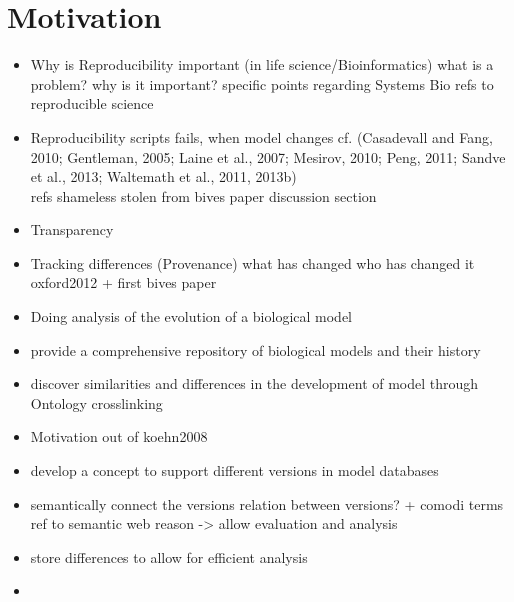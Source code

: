 \section{Motivation}

\begin{itemize}
\item Why is Reproducibility important (in life science/Bioinformatics)
	\subitem what is a problem?
	\subitem why is it important?
	\subitem specific points regarding Systems Bio
	\subitem refs to reproducible science
\item Reproducibility
	\subitem \sedml scripts fails, when model changes
	\subitem cf. (Casadevall and Fang, 2010; Gentleman, 2005; Laine et al., 2007; Mesirov, 2010; Peng, 2011; Sandve et al., 2013; Waltemath et al., 2011, 2013b) \\ refs shameless stolen from bives paper discussion section

\item Transparency
\item Tracking differences (Provenance)
	\subitem what has changed
	\subitem who has changed it
	\subitem oxford2012 + first bives paper
	
\item Doing analysis of the evolution of a biological model
\item provide a comprehensive repository of biological models and their history
\item discover similarities and differences in the development of model through Ontology crosslinking
\item Motivation out of koehn2008 \cite{Kohn2008}
\end{itemize}

\begin{itemize}
\item develop a concept to support different versions in model databases
	\subitem {}
	\subitem {}
\item semantically connect the versions
	\subitem relation between versions? + comodi terms
	\subitem ref to semantic web
	\subitem reason -> allow evaluation and analysis
\item store differences to allow for efficient analysis
\item {}
\end{itemize}
